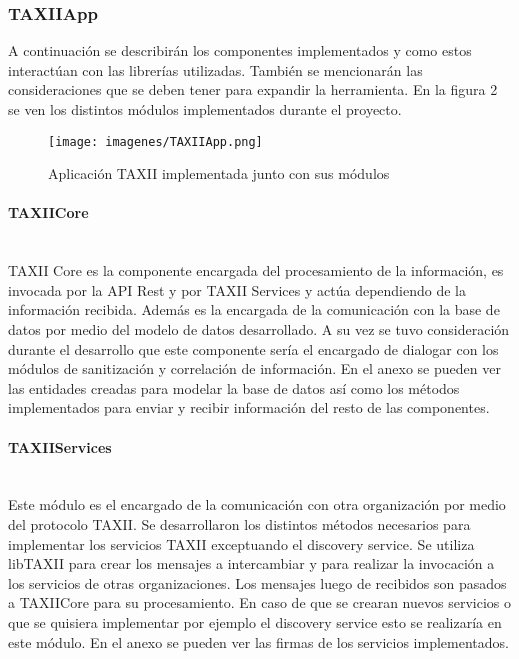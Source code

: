 \documentclass[11pt]{article}
\begin{document}
\subsubsection{TAXIIApp}
A continuación se describirán los componentes implementados y como estos interactúan con las librerías utilizadas.
También se mencionarán las consideraciones que se deben tener para expandir la herramienta.
En la figura 2 se ven los distintos módulos implementados durante el proyecto. 

\begin{figure}
	\centering
	\texttt{[image: imagenes/TAXIIApp.png]}
	\caption{Aplicación TAXII implementada junto con sus módulos}
	\label{fig.taxii_app}
\end{figure}

\paragraph{TAXIICore}\ \\
TAXII Core es la componente encargada del procesamiento de la información, es invocada por la API Rest y por TAXII Services y actúa dependiendo de la información recibida. Además es la encargada de la comunicación con la base de datos por medio del modelo de datos desarrollado. A su vez se tuvo consideración durante el desarrollo que este componente sería el encargado de dialogar con los módulos de sanitización y correlación de información. 
En el anexo se pueden ver las entidades creadas para modelar la base de datos así como los métodos implementados para enviar y recibir información del resto de las componentes.

\paragraph{TAXIIServices}\ \\
Este módulo es el encargado de la comunicación con otra organización por medio del protocolo TAXII. Se desarrollaron  los distintos métodos necesarios para implementar los servicios TAXII exceptuando el discovery service.
Se utiliza libTAXII para crear los mensajes a intercambiar y para realizar la invocación a los servicios de otras organizaciones.
Los mensajes luego de recibidos son pasados a TAXIICore para su procesamiento.
En caso de que se crearan nuevos servicios o que se quisiera implementar por ejemplo el discovery service esto se realizaría en este módulo.
En el anexo se pueden ver las firmas de los servicios implementados.
\end{document}
